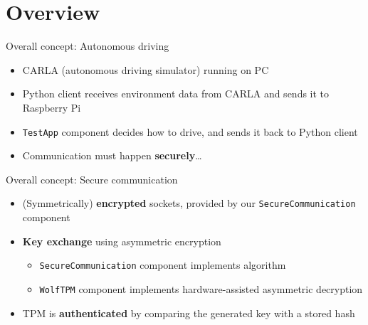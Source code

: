 \section{Overview}

\begin{frame}{Overall concept: Autonomous driving}
\begin{itemize}
\item CARLA (autonomous driving simulator) running on PC
\item Python client receives environment data from CARLA and sends it to Raspberry Pi
\item \texttt{TestApp} component decides how to drive, and sends it back to Python client
\item Communication must happen \textbf{securely}\ldots
\end{itemize}
\end{frame}

\begin{frame}{Overall concept: Secure communication}
\begin{itemize}
\item (Symmetrically) \textbf{encrypted} sockets, provided by our \texttt{SecureCommunication} component
\item \textbf{Key exchange} using asymmetric encryption
  \begin{itemize}
  \item \texttt{SecureCommunication} component implements algorithm
  \item \texttt{WolfTPM} component implements hardware-assisted asymmetric decryption
  \end{itemize}
\item TPM is \textbf{authenticated} by comparing the generated key with a stored hash
\end{itemize}
\end{frame}
